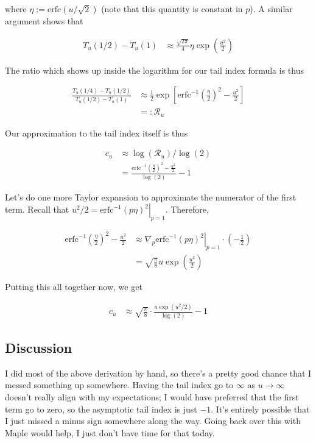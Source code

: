 \documentclass{article}
\begin{document}
where $\eta:= \mathrm{erfc}(u / \sqrt{2})$ (note that this quantity is constant in $p$). A similar argument shows that 

\begin{align}
    T_u(1/2) - T_u(1) &\approx \frac{\sqrt{2\pi}}{4} \eta \exp \left( \frac{u^2}{2} \right)
\end{align}

The ratio which shows up inside the logarithm for our tail index formula is thus

\begin{align}
    \frac{T_u(1/4) - T_u(1/2)}{T_u(1/2) - T_u(1)} & \approx \frac{1}{2} \exp \left[ \mathrm{erfc}^{-1} \left( \frac{\eta}{2} \right)^2 - \frac{u^2}{2} \right]\\
    &=: \mathcal{R}_u
\end{align}

Our approximation to the tail index itself is thus

\begin{align}
    c_u &\approx \log(\mathcal{R}_u) / \log(2)\\
    &= \frac{\mathrm{erfc}^{-1} \left( \frac{\eta}{2} \right)^2 - \frac{u^2}{2}}{\log(2)} - 1
\end{align}

Let's do one more Taylor expansion to approximate the numerator of the first term. Recall that $u^2 / 2 = \left. \mathrm{erfc}^{-1}(p \eta)^2 \right|_{p=1}$. Therefore,

\begin{align}
    \mathrm{erfc}^{-1} \left( \frac{\eta}{2} \right)^2 - \frac{u^2}{2} & \approx \nabla_p \left. \mathrm{erfc}^{-1}(p \eta)^2 \right|_{p=1} \cdot \left( - \frac{1}{2} \right)\\
    &= \sqrt{\frac{\pi}{8}} u \exp \left( \frac{u^2}{2} \right)
\end{align}

Putting this all together now, we get 

\begin{align}
    c_u & \approx \sqrt{\frac{\pi}{8}} \cdot  \frac{u  \exp(u^2 / 2)}{\log(2)} - 1 \label{eq:approx_tail_index}
\end{align}

\subsection{Discussion}

I did most of the above derivation by hand, so there's a pretty good chance that I messed something up somewhere. Having the tail index go to $\infty$ as $u \rightarrow \infty$ doesn't really align with my expectations; I would have preferred that the first term go to zero, so the asymptotic tail index is just $-1$. It's entirely possible that I just missed a minus sign somewhere along the way. Going back over this with Maple would help, I just don't have time for that today.
\end{document}

